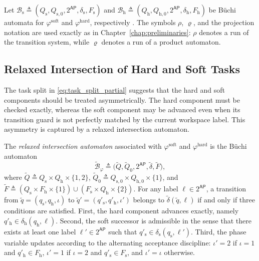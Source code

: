Let $\mathcal{B}_{\mathrm{s}} \triangleq
(Q_{\mathrm{s}},Q_{\mathrm{s},0},2^{\mathsf{AP}},
\delta_{\mathrm{s}},F_{\mathrm{s}})$ and
$\mathcal{B}_{\mathrm{h}} \triangleq
(Q_{\mathrm{h}},Q_{\mathrm{h},0},2^{\mathsf{AP}},
\delta_{\mathrm{h}},F_{\mathrm{h}})$ be B\"uchi automata for
$\varphi^{\mathrm{soft}}$ and $\varphi^{\mathrm{hard}}$, respectively
\cite{baier2008principles,vardi1986automata,gastin2001fast}. The symbols
$\rho$, $\varrho$, and the projection notation are used exactly as in
Chapter~\ref{chap:preliminaries}: $\rho$ denotes a run of the transition
system, while $\varrho$ denotes a run of a product automaton.

\subsection{Relaxed Intersection of Hard and Soft Tasks}
\label{subsec:relaxed_intersection}

The task split in \eqref{eq:task_split_partial} suggests that the hard and soft
components should be treated asymmetrically. The hard component must be checked
exactly, whereas the soft component may be advanced even when its transition
guard is not perfectly matched by the current workspace label. This asymmetry is
captured by a relaxed intersection automaton.

\begin{definition}
\label{def:relaxed_intersection}
The \emph{relaxed intersection automaton} associated with
$\varphi^{\mathrm{soft}}$ and $\varphi^{\mathrm{hard}}$ is the B\"uchi
automaton
\begin{equation}
\widetilde{\mathcal{B}}_{\varphi} \triangleq
\bigl(\widetilde{Q},\widetilde{Q}_{0},2^{\mathsf{AP}},
\widetilde{\delta},\widetilde{F}\bigr),
\label{eq:relaxed_intersection_automaton}
\end{equation}
where
$\widetilde{Q} \triangleq
Q_{\mathrm{s}} \times Q_{\mathrm{h}} \times \{1,2\}$,
$\widetilde{Q}_{0} \triangleq
Q_{\mathrm{s},0} \times Q_{\mathrm{h},0} \times \{1\}$, and
\(\widetilde{F} \triangleq
(Q_{\mathrm{s}} \times F_{\mathrm{h}} \times \{1\})
\cup (F_{\mathrm{s}} \times Q_{\mathrm{h}} \times \{2\})\).
For any label $\ell \in 2^{\mathsf{AP}}$, a transition from
$\widetilde{q}=(q_{\mathrm{s}},q_{\mathrm{h}},\iota)$ to
$\widetilde{q}'=(q'_{\mathrm{s}},q'_{\mathrm{h}},\iota')$ belongs to
$\widetilde{\delta}(\widetilde{q},\ell)$ if and only if three conditions are
satisfied. First, the hard component advances exactly, namely
$q'_{\mathrm{h}} \in \delta_{\mathrm{h}}(q_{\mathrm{h}},\ell)$. Second, the
soft successor is admissible in the sense that there exists at least one label
$\ell' \in 2^{\mathsf{AP}}$ such that
$q'_{\mathrm{s}} \in \delta_{\mathrm{s}}(q_{\mathrm{s}},\ell')$. Third, the
phase variable updates according to the alternating acceptance discipline:
$\iota' = 2$ if $\iota = 1$ and $q'_{\mathrm{h}} \in F_{\mathrm{h}}$,
$\iota' = 1$ if $\iota = 2$ and $q'_{\mathrm{s}} \in F_{\mathrm{s}}$, and
$\iota' = \iota$ otherwise.
\end{definition}

